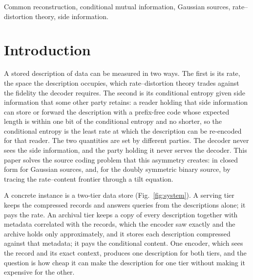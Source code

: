 \documentclass[11pt,onecolumn]{IEEEtran}
\begin{document}
\begin{IEEEkeywords}
Common reconstruction, conditional mutual information, Gaussian sources,
rate--distortion theory, side information.
\end{IEEEkeywords}

\section{Introduction}
\label{sec:intro}

A stored description of data can be measured in two ways. The first is
its rate, the space the description occupies, which rate--distortion
theory trades against the fidelity the decoder requires. The second is
its conditional entropy given side information that some other party
retains: a reader holding that side information can store or forward the
description with a prefix-free code whose expected length is within one
bit of the conditional entropy and no shorter, so the conditional entropy
is the least rate at which the description can be re-encoded for that
reader. The two quantities are set by different parties. The decoder
never sees the side information, and the party holding it never serves
the decoder. This paper solves the source coding problem that this
asymmetry creates: in closed form for Gaussian sources, and, for the
doubly symmetric binary source, by tracing the rate--content frontier
through a tilt equation.

A concrete instance is a two-tier data store (Fig.~\ref{fig:system}). A
serving tier keeps the compressed records and answers queries from the
descriptions alone; it pays the rate. An archival tier keeps a copy of
every description together with metadata correlated with the records,
which the encoder saw exactly and the archive holds only approximately,
and it stores each description compressed against that metadata; it
pays the conditional content. One encoder, which sees the record and
its exact context, produces one description for both tiers, and the
question is how cheap it can make the description for one tier without
making it expensive for the other.
\end{document}

